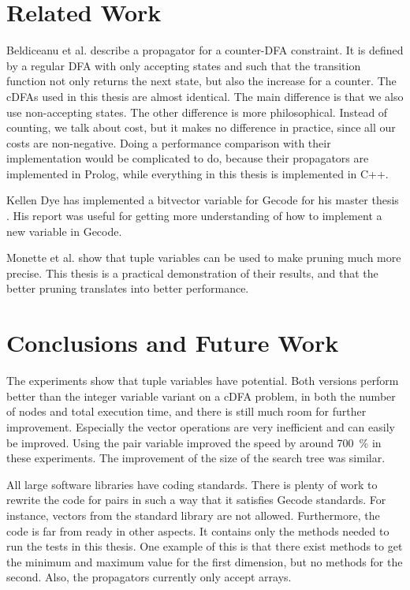 \documentclass[a4paper,11pt]{article}
\begin{document}
\section{Related Work}
Beldiceanu et al. \cite{Beldiceanu675954} describe a propagator for a counter-DFA constraint. It is defined by a regular DFA with only accepting states and such that the transition function not only returns the next state, but also the increase for a counter. The cDFAs used in this thesis are almost identical. The main difference is that we also use non-accepting states. The other difference is more philosophical. Instead of counting, we talk about cost, but it makes no difference in practice, since all our costs are non-negative. Doing a performance comparison with their implementation would be complicated to do, because their propagators are implemented in Prolog, while everything in this thesis is implemented in C++.

Kellen Dye \cite{Dye761927} has implemented a bitvector variable for Gecode for his master thesis \cite{Dye761927}. His report was useful for getting more understanding of how to implement a new variable in Gecode.

Monette et al. \cite{Monette771427} show that tuple variables can be used to make pruning much more precise. This thesis is a practical demonstration of their results, and that the better pruning translates into better performance.

\section{Conclusions and Future Work}
The experiments show that tuple variables have potential. Both versions perform better than the integer variable variant on a cDFA problem, in both the number of nodes and total execution time, and there is still much room for further improvement. Especially the vector operations are very inefficient and can easily be improved. Using the pair variable improved the speed by around \SI{700}{\percent} in these experiments. The improvement of the size of the search tree was similar.

All large software libraries have coding standards. There is plenty of work to rewrite the code for pairs in such a way that it satisfies Gecode standards. For instance, vectors from the standard library are not allowed. Furthermore, the code is far from ready in other aspects. It contains only the methods needed to run the tests in this thesis. One example of this is that there exist methods to get the minimum and maximum value for the first dimension, but no methods for the second. Also, the propagators currently only accept arrays. 
\end{document}
